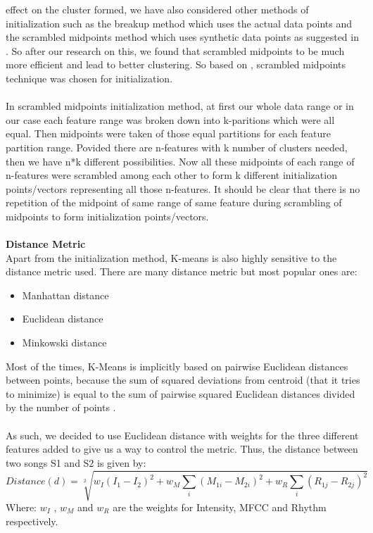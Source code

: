 {effect on the cluster formed, we have also considered other methods of initialization such as the breakup method which uses the actual data points
and the scrambled midpoints method which uses synthetic data points as suggested in \cite{prasad2007}. So after our research on this, we found that 
scrambled midpoints to be much more efficient and lead to better clustering. So based on \cite{Apon2006}, scrambled midpoints technique was
chosen for initialization.\\
\\ 
In scrambled midpoints initialization method, at first our whole data range or in our case each feature range was broken down into k-paritions which were
all equal. Then midpoints were taken of those equal partitions for each feature partition range. Povided there are n-features with k
number of clusters needed, then we have n*k different possibilities. Now all these midpoints of each range of n-features were scrambled among
each other to form k different initialization points/vectors representing all those n-features. It should be clear that there is no repetition of the midpoint of same range 
of same feature during scrambling of midpoints to form initialization points/vectors.\\  
\\
\textbf{Distance Metric}\\
Apart from the initialization method, K-means is also highly sensitive to the distance metric used. There are many distance metric but most popular ones are: 
\begin{itemize}
        \item Manhattan distance
        \item Euclidean distance
        \item Minkowski distance
\end{itemize}
Most of the times, K-Means is implicitly based on pairwise Euclidean distances between points, because the sum of squared deviations from centroid (that it tries to minimize) is equal
to the sum of pairwise squared Euclidean distances divided by the number of points \cite{Neumayer2004}.\\ 
\\
As such, we decided to use Euclidean distance with weights for the three different features added to give us a way to control the metric. Thus, the
distance between two songs S1 and S2 is given by: 
\begin{equation}
        Distance(d)=\sqrt[2]{w_I(I_1-I_2)^2+w_M\sum_{i}{(M_{1i}-M_{2i})^2}+w_R\sum_{i}{(R_{1j}-R_{2j})^2}}
\end{equation}
Where: $w_I$ , $w_M$  and $w_R$ are the weights for Intensity, MFCC and Rhythm respectively. 

}
